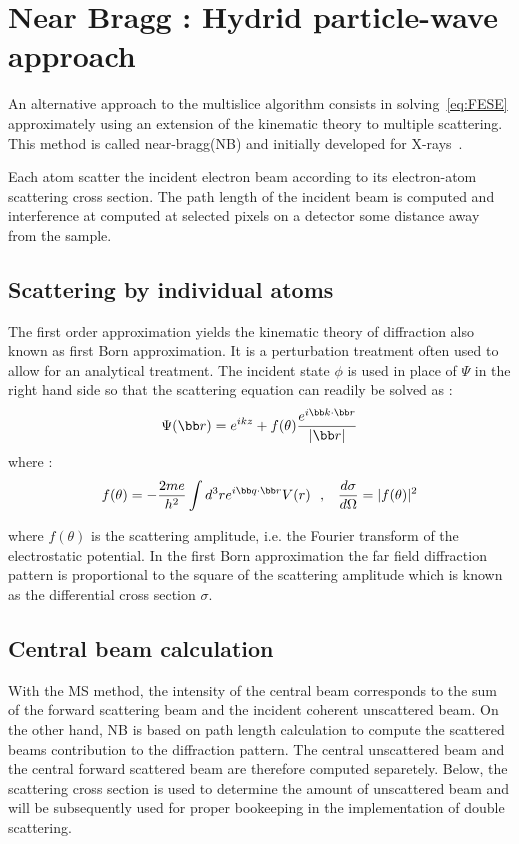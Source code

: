 \documentclass[a4paper,10pt]{article}
\begin{document}
\section{Near Bragg : Hydrid particle-wave approach}
An alternative approach to the multislice algorithm consists in solving~\eqref{eq:FESE} approximately using an extension of the kinematic theory to multiple scattering. This method is called near-bragg(NB) and initially developed for X-rays~\cite{Holton}.

Each atom scatter the incident electron beam according to its electron-atom scattering cross section. The path length of the incident beam is computed and interference at computed at selected pixels on a detector some distance away from the sample.

\subsection{Scattering by individual atoms}
The first order approximation yields the kinematic theory of diffraction also known as first Born approximation. It is a perturbation treatment often used to allow for an analytical treatment. The incident state $\phi$ is used in place of $\Psi$ in the right hand side so that the scattering equation can readily be solved as :
\begin{equation}
    \Psi(\bb r)=e^{ikz} + f(\theta)\frac{e^{i\bb k\cdot\bb r}}{|\bb r|}
\end{equation}
where :
\begin{equation}
    f(\theta) = -\frac{2me}{h^2}\int d^3re^{i\bb q\cdot\bb r}V(r)
~~\mbox{,     }~~
    \frac{d\sigma}{d\Omega} = |f(\theta)|^2
\end{equation}

where $f(\theta)$ is the scattering amplitude, i.e. the Fourier transform of the electrostatic potential.
In the first Born approximation the far field diffraction pattern is proportional to the square of the scattering amplitude which is known as the differential cross section $\sigma$.


\subsection{Central beam calculation}
With the MS method, the intensity of the central beam corresponds to the sum of the forward scattering beam and the incident coherent unscattered beam.
On the other hand, NB is based on path length calculation to compute the scattered beams contribution to the diffraction pattern.
The central unscattered beam and the central forward scattered beam are therefore computed separetely.
Below, the scattering cross section is used to determine the amount of unscattered beam and will be subsequently used for proper bookeeping in the implementation of double scattering.
\end{document}
